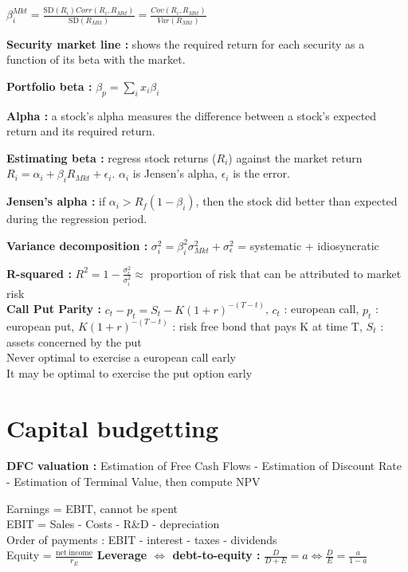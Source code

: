 \documentclass[a4paper,twocolumn]{article}
\newcommand{\SD} {\mathrm{SD}}
\begin{document}
$\beta_i^{Mkt} = \frac{\SD(R_i) Corr(R_i, R_{Mkt})}{\SD(R_{Mkt})} = \frac{Cov(R_i, R_{Mkt})}{Var(R_{Mkt})}$

\textbf{Security market line :} shows the required return for each security as a function of its beta with the market.

\textbf{Portfolio beta :} $\beta_p = \sum_i x_i \beta_i$

\textbf{Alpha :} a stock's alpha measures the difference between a stock's expected return and its required return.

\textbf{Estimating beta :} regress stock returns ($R_i$) against the market return $R_i = \alpha_i + \beta_i R_{Mkt} + \epsilon_i$. $\alpha_i$ is Jensen's alpha, $\epsilon_i$ is the error.

\textbf{Jensen's alpha :} if $\alpha_i > R_f (1 - \beta_i)$, then the stock did better than expected during the regression period.

\textbf{Variance decomposition :} $\sigma_i^2 = \beta_i^2 \sigma_{Mkt}^2 + \sigma_{\epsilon}^2$ = systematic + idiosyncratic

\textbf{R-squared :} $R^2 = 1 - \frac{\sigma_{\epsilon}^2}{\sigma_i^2} \approx $  proportion of risk that can be attributed to market risk\\


\textbf{Call Put Parity :} $c_t - p_t = S_t - K(1+r)^{-(T-t)}$, $c_t$ : european call, $p_t$ : european put, $K(1+r)^{-(T-t)}$ : risk free bond that pays K at time T, $S_t$ : assets concerned by the put\\
Never optimal to exercise a european call early\\
It may be optimal to exercise the put option early\\


\section*{Capital budgetting}

\textbf{DFC valuation :} Estimation of Free Cash Flows - Estimation of Discount Rate - Estimation of Terminal Value, then compute NPV

Earnings = EBIT, cannot be spent\\
EBIT = Sales - Costs - R\&D - depreciation\\
Order of payments : EBIT - interest - taxes - dividends\\
Equity = $\frac{\mathrm{net\ income}}{r_E}$ \textbf{Leverage $\Leftrightarrow$ debt-to-equity : } $\frac{D}{D+E} = a \Leftrightarrow \frac{D}{E} = \frac{a}{1-a}$
\end{document}
